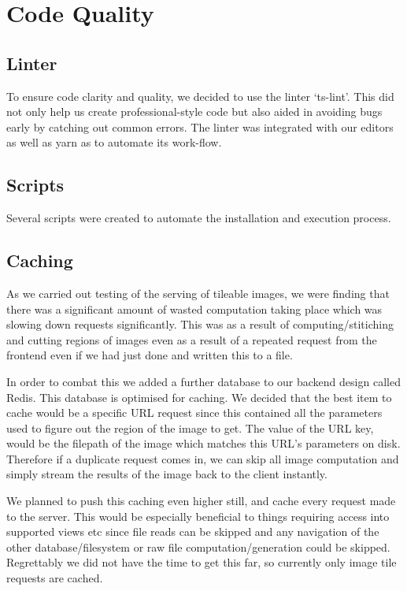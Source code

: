 \section{Code Quality}
\subsection{Linter}
To ensure code clarity and quality, we decided to use the linter `ts-lint'. This did not only help us create professional-style code but also aided in avoiding bugs early by catching out common errors. The linter was integrated with our editors as well as yarn as to automate its work-flow.

\subsection{Scripts}
Several scripts were created to automate the installation and execution process.

\subsection{Caching}
As we carried out testing of the serving of tileable images, we were finding that there was a significant amount of wasted computation taking place
which was slowing down requests significantly. This was as a result of computing/stitiching and cutting regions of images even as a result of a
repeated request from the frontend even if we had just done and written this to a file.

In order to combat this we added a further database to our backend design called Redis. This database is optimised for caching.
We decided that the best item to cache would be a specific URL request since this contained all the parameters used to figure
out the region of the image to get. The value of the URL key, would be the filepath of the image which matches this URL's parameters on disk.
Therefore if a duplicate request comes in, we can skip all image computation and simply stream the results of the image back to the client instantly.

We planned to push this caching even higher still, and cache every request made to the server. This would be especially beneficial to things requiring access
into supported views etc since file reads can be skipped and any navigation of the other database/filesystem or raw file computation/generation could be skipped.
Regrettably we did not have the time to get this far, so currently only image tile requests are cached.
